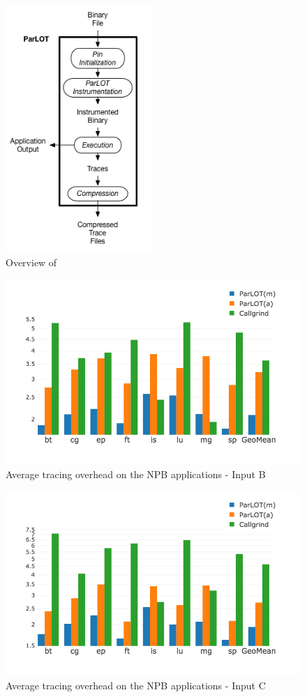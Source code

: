 \begin{figure}[]
\centering
\includegraphics[width=2.2in]{parlot/overview3.png}
\caption{Overview of \parlot}
\label{overview}
\end{figure}


\begin{figure}[]
\centering
\includegraphics[width=.75\textwidth]{parlot/figs.comet.newMed/comet_chartAvg_sd_B_p3_5.png}
\caption{Average tracing overhead on the NPB applications - Input B}
\label{comet_chartAvg_sd_B_p3_5}
\end{figure}

\begin{figure}[]
\centering
\includegraphics[width=.75\textwidth]{parlot/figs.comet.newMed/comet_chartAvg_sd_C_p3_5.png}
\caption{ Average tracing overhead on the NPB applications - Input C}
\label{comet_chartAvg_sd_C_p3_5}
\end{figure}


